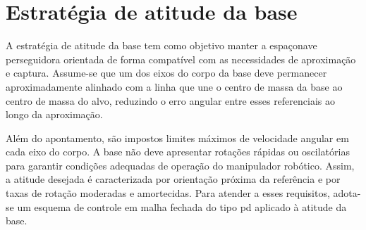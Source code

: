 \section{Estratégia de atitude da base}
\label{sec:estrategia_atitude_base}

A estratégia de atitude da base tem como objetivo manter a espaçonave perseguidora orientada de forma compatível com as necessidades de aproximação e captura.
Assume-se que um dos eixos do corpo da base deve permanecer aproximadamente alinhado com a linha que une o centro de massa da base ao centro de massa do alvo, reduzindo o erro angular entre esses referenciais ao longo da aproximação.

Além do apontamento, são impostos limites máximos de velocidade angular em cada eixo do corpo.
A base não deve apresentar rotações rápidas ou oscilatórias para garantir condições adequadas de operação do manipulador robótico. 
Assim, a atitude desejada é caracterizada por orientação próxima da referência e por taxas de rotação moderadas e amortecidas.
Para atender a esses requisitos, adota-se um esquema de controle em malha fechada do tipo \gls{pd} aplicado à atitude da base.
